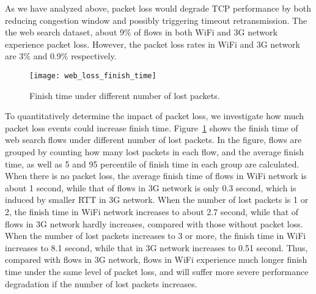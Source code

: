 
As we have analyzed above, packet loss would degrade TCP performance by both reducing congestion window and possibly triggering timeout retransmission. The the web search dataset, about 9\% of flows in both WiFi and 3G network experience packet loss. However, the packet loss rates in WiFi and 3G network are 3\% and 0.9\% respectively.


\begin{figure}[th]
\centering
\texttt{[image: web\_loss\_finish\_time]}
\caption{Finish time under different number of lost packets.}
\label{fig:web_loss_finish_time}
\end{figure}

To quantitatively determine the impact of packet loss, we investigate how much packet loss events could increase finish time. Figure~\ref{fig:web_loss_finish_time} shows the finish time of web search flows under different number of lost packets. In the figure, flows are grouped by counting how many lost packets in each flow, and the average finish time, as well as 5 and 95 percentile of finish time in each group are calculated. When there is no packet loss, the average finish time of flows in WiFi network is about 1 second, while that of flows in 3G network is only 0.3 second, which is induced by smaller RTT in 3G network. When the number of lost packets is 1 or 2, the finish time in WiFi network increases to about 2.7 second, while that of flows in 3G network hardly increases, compared with those without packet loss. When the number of lost packets increases to 3 or more, the finish time in WiFi increases to 8.1 second, while that in 3G network increases to 0.51 second. Thus, compared with flows in 3G network, flows in WiFi experience much longer finish time under the same level of packet loss, and will suffer more severe performance degradation if the number of lost packets increases. 

